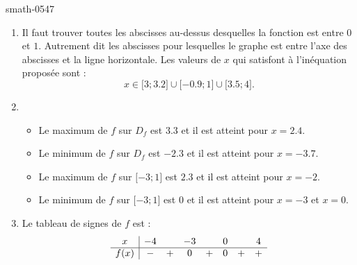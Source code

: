 \begin{corrige}{smath-0547}
\begin{enumerate}
        \item
            Il faut trouver toutes les abscisses au-dessus desquelles la fonction est entre \( 0\) et \( 1\). Autrement dit les abscisses pour lesquelles le graphe est entre l'axe des abscisses et la ligne horizontale. Les valeurs de \( x\) qui satisfont à l'inéquation proposée sont :
            \begin{equation}
                x\in\mathopen[ 3 ; 3.2 \mathclose]\cup\mathopen[ -0.9 ; 1 \mathclose]\cup\mathopen[ 3.5 ; 4 \mathclose].
            \end{equation}
        \item
            \begin{itemize}
                \item  Le maximum de \( f\) sur \( D_f\) est \( 3.3\) et il est atteint pour \( x=2.4\).
                \item  Le minimum de \( f\) sur \( D_f\) est \( -2.3\) et il est atteint pour \( x=-3.7\).
                \item  Le maximum de \( f\) sur \( \mathopen[ -3 ; 1 \mathclose]\) est \( 2.3\) et il est atteint pour \( x=-2\).
                \item  Le minimum de \( f\) sur \( \mathopen[ -3 ; 1 \mathclose]\) est \( 0\) et il est atteint pour \( x=-3\) et \( x=0\).
            \end{itemize}
        \item
            Le tableau de signes de \( f\) est :
            \begin{equation*}
                \begin{array}[]{c|ccccccc}
                    x&-4&&-3&&0&&4\\
                    \hline
                    f(x)&-&+&0&+&0&+&+\\
                \end{array}
            \end{equation*}
            
    \end{enumerate} 

\end{corrige}
